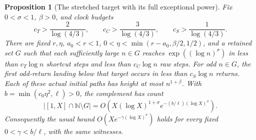 \documentclass[11pt]{article}
\newtheorem{proposition}{Proposition}
\theoremstyle{remark}\newtheorem{remark}[proposition]{Remark}
\newcommand{\NN}{\mathbb N}
\begin{document}
\begin{proposition}[The stretched target with its full exceptional power]
\label{prop:shaik-stretched-fixed}
Fix \(0<\sigma<1\), \(\beta>0\), and clock budgets
\[
 c_T>\frac2{\log(4/3)},\qquad
 c_C>\frac3{\log(4/3)},\qquad
 c_S>\frac1{\log(4/3)}.
\]
There are fixed \(r,\eta\), \(a_0<r<1\),
\(0<\eta<\min(r-a_0,\beta/2,1/2)\), and a retained set \(G\) such that
each sufficiently large \(n\in G\) reaches
\(\exp((\log n)^\sigma)\) in less than \(c_T\log n\) shortcut steps
and less than \(c_C\log n\) raw steps.
For odd \(n\in G\), the first odd-return landing below that target
occurs in less than \(c_S\log n\) returns.
Each of these actual initial paths has height at most \(n^{1+\beta}\).
With \(b=\min(c_0\eta^2,\ell)>0\), the complement has count
\begin{equation}\label{eq:shaik-stretched-rate}
 |[1,X]\cap\NN\setminus G|
 =O\left(X(\log X)^{1+\sigma}
        e^{-(b/\ell)(\log X)^\sigma}\right).
\end{equation}
Consequently the usual bound \(O(Xe^{-\gamma(\log X)^\sigma})\)
holds for every fixed \(0<\gamma<b/\ell\), with the same witnesses.
\end{proposition}
\end{document}

